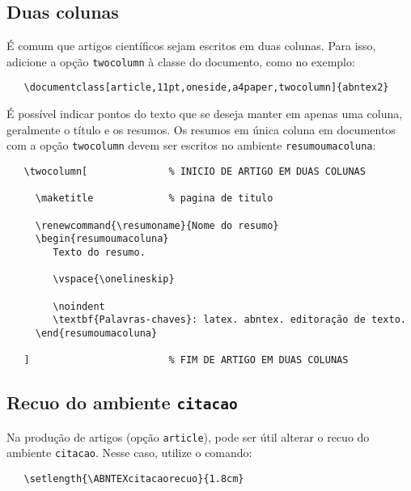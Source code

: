 \documentclass[
	article,			%
	11pt,				%
	oneside,			%
	a4paper,			%
	english,			%
	brazil,				%
	]{abntex2}
\begin{document}
\subsection{Duas colunas}

É comum que artigos científicos sejam escritos em duas colunas. Para isso,
adicione a opção \texttt{twocolumn} à classe do documento, como no exemplo:

\begin{verbatim}
   \documentclass[article,11pt,oneside,a4paper,twocolumn]{abntex2}
\end{verbatim}

É possível indicar pontos do texto que se deseja manter em apenas uma coluna,
geralmente o título e os resumos. Os resumos em única coluna em documentos com
a opção \texttt{twocolumn} devem ser escritos no ambiente
\texttt{resumoumacoluna}:

\begin{verbatim}
   \twocolumn[              % INICIO DE ARTIGO EM DUAS COLUNAS

     \maketitle             % pagina de titulo

     \renewcommand{\resumoname}{Nome do resumo}
     \begin{resumoumacoluna}
        Texto do resumo.
      
        \vspace{\onelineskip}
 
        \noindent
        \textbf{Palavras-chaves}: latex. abntex. editoração de texto.
     \end{resumoumacoluna}
   
   ]                        % FIM DE ARTIGO EM DUAS COLUNAS
\end{verbatim}

\subsection{Recuo do ambiente \texttt{citacao}}

Na produção de artigos (opção \texttt{article}), pode ser útil alterar o recuo
do ambiente \texttt{citacao}. Nesse caso, utilize o comando:

\begin{verbatim}
   \setlength{\ABNTEXcitacaorecuo}{1.8cm}
\end{verbatim}
\end{document}
